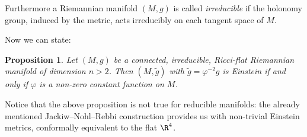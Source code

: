 \documentclass[a4paper,12pt,draft]{article}
\newtheorem{proposition}[theorem]{Proposition}
\begin{document}
Furthermore a Riemannian manifold $(M,g)$ is called {\it irreducible} if 
the holonomy group, induced by the metric, acts irreducibly on each
tangent space of $M$. 

Now we can state:

\begin{proposition} 
Let $(M,g)$ be a connected, irreducible, Ricci-flat Riemannian
manifold of dimension $n>2$. Then $(M,\tilde{g})$ with
$\tilde{g}=\varphi^{-2}g$ is Einstein if and only if $\varphi$ is a
non-zero constant function on $M$. 
\end{proposition}

 Notice that the above proposition is not true
for reducible manifolds: the already mentioned Jackiw--Nohl--Rebbi
construction \cite{jac-noh-reb} provides us with non-trivial Einstein metrics,
conformally equivalent to the flat $\R^4$. 
\vspace{0.1in}
\end{document}
